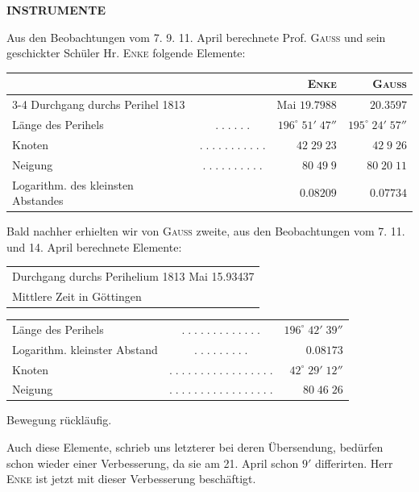 \clearpage
\thispagestyle{empty}
\noindent{}%
\makebox[12mm][l]{}%
\parbox[t]{\dimexpr\linewidth-24mm\relax}{\centering\footnotesize\bfseries INSTRUMENTE\par}%
\par\nobreak\medskip
\par\indent Aus den Beobachtungen vom 7. 9. 11. April berechnete Prof. \textsc{Gauss} und sein geschickter Schüler Hr. \textsc{Enke} folgende Elemente:

\begin{center}\fontsize{9}{11}\selectfont\setlength{\tabcolsep}{5pt}\renewcommand{\arraystretch}{1.15}\begin{tabular}{lcr|r}
& & \textsc{Enke} & \textsc{Gauss}\\
\cline{3-4}
Durchgang durchs Perihel 1813 & & Mai $19.7988$ & $20.3597$\\
Länge des Perihels & $.\;.\;.\;.\;.\;.$ & $196^\circ\;51'\;47''$ & $195^\circ\;24'\;57''$\\
Knoten & $.\;.\;.\;.\;.\;.\;.\;.\;.\;.\;.$ & $42\;29\;23$ & $42\;9\;26$\\
Neigung & $.\;.\;.\;.\;.\;.\;.\;.\;.\;.$ & $80\;49\;9$ & $80\;20\;11$\\
Logarithm. des kleinsten Abstandes &  & $0.08209$ & $0.07734$\\
\end{tabular}\end{center}

\par\indent Bald nachher erhielten wir von \textsc{Gauss} zweite, aus den Beobachtungen vom 7. 11. und 14. April berechnete Elemente:

\begin{center}\fontsize{10}{12}\selectfont\setlength{\tabcolsep}{2pt}\renewcommand{\arraystretch}{1.15}\begin{tabular}{l}
Durchgang durchs Perihelium 1813 Mai 15.93437\\Mittlere Zeit in Göttingen\\
\end{tabular}\end{center}\begin{center}\fontsize{10}{12}\selectfont\setlength{\tabcolsep}{2pt}\renewcommand{\arraystretch}{1.15}\begin{tabular}{lcr}
Länge des Perihels & $.\;.\;.\;.\;.\;.\;.\;.\;.\;.\;.\;.\;.$ & $196^\circ\;42'\;39''$\\
Logarithm. kleinster Abstand & $.\;.\;.\;.\;.\;.\;.\;.\;.$ & $0.08173$\\
Knoten & $.\;.\;.\;.\;.\;.\;.\;.\;.\;.\;.\;.\;.\;.\;.\;.\;.$ & $42^\circ\;29'\;12''$\\
Neigung & $.\;.\;.\;.\;.\;.\;.\;.\;.\;.\;.\;.\;.\;.\;.\;.\;.$ & $80\;46\;26$\\
\end{tabular}\end{center}

\noindent Bewegung rückläufig.

\par\indent Auch diese Elemente, schrieb uns letzterer bei deren Übersendung, bedürfen schon wieder einer Verbesserung, da sie am 21. April schon $9'$ differirten. Herr \textsc{Enke} ist jetzt mit dieser Verbesserung beschäftigt.

